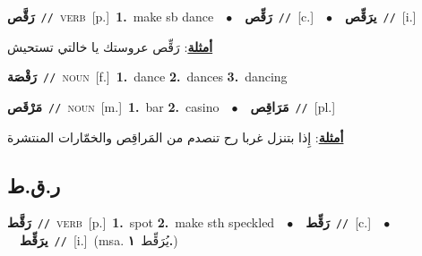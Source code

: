\documentclass[10pt,a4paper,twoside]{article} %
\begin{document}
\begin{multicols}{2}
{\setlength\topsep{0pt}\textbf{\foreignlanguage{arabic}{رَقَّص}}\ {\color{gray}\texttt{//}\color{black}}\ \textsc{verb}\ [p.]\ \textbf{1.}~make sb dance\ \ $\bullet$\ \ \setlength\topsep{0pt}\textbf{\foreignlanguage{arabic}{رَقِّص}}\ {\color{gray}\texttt{//}\color{black}}\ [c.]\ \ $\bullet$\ \ \setlength\topsep{0pt}\textbf{\foreignlanguage{arabic}{يرَقِّص}}\ {\color{gray}\texttt{//}\color{black}}\ [i.]\  \begin{flushright}\color{gray}\foreignlanguage{arabic}{\textbf{\underline{\foreignlanguage{arabic}{أمثلة}}}: رَقِّص عروستك يا خالتي تستحيش}\end{flushright}\color{black}} \vspace{2mm}

{\setlength\topsep{0pt}\textbf{\foreignlanguage{arabic}{رَقْصَة}}\ {\color{gray}\texttt{//}\color{black}}\ \textsc{noun}\ [f.]\ \textbf{1.}~dance  \textbf{2.}~dances  \textbf{3.}~dancing\ } \vspace{2mm}

{\setlength\topsep{0pt}\textbf{\foreignlanguage{arabic}{مَرْقَص}}\ {\color{gray}\texttt{//}\color{black}}\ \textsc{noun}\ [m.]\ \textbf{1.}~bar  \textbf{2.}~casino\ \ $\bullet$\ \ \setlength\topsep{0pt}\textbf{\foreignlanguage{arabic}{مَرَاقِص}}\ {\color{gray}\texttt{//}\color{black}}\ [pl.]\  \begin{flushright}\color{gray}\foreignlanguage{arabic}{\textbf{\underline{\foreignlanguage{arabic}{أمثلة}}}: إِذا بتنزل غربا رح تنصدم من المَراقِص والخمّارات المنتشرة}\end{flushright}\color{black}} \vspace{2mm}

\vspace{-3mm}
\subsection*{\color{blue}\foreignlanguage{arabic}{ر.ق.ط}\color{blue}{}} 

{\setlength\topsep{0pt}\textbf{\foreignlanguage{arabic}{رَقَّط}}\ {\color{gray}\texttt{//}\color{black}}\ \textsc{verb}\ [p.]\ \textbf{1.}~spot  \textbf{2.}~make sth speckled\ \ $\bullet$\ \ \setlength\topsep{0pt}\textbf{\foreignlanguage{arabic}{رَقِّط}}\ {\color{gray}\texttt{//}\color{black}}\ [c.]\ \ $\bullet$\ \ \setlength\topsep{0pt}\textbf{\foreignlanguage{arabic}{يرَقِّط}}\ {\color{gray}\texttt{//}\color{black}}\ [i.]\ \color{gray}(msa. \foreignlanguage{arabic}{يُرَقِّط}~\foreignlanguage{arabic}{\textbf{١.}})\color{black}\ } \vspace{2mm}


\end{multicols}
\end{document}
